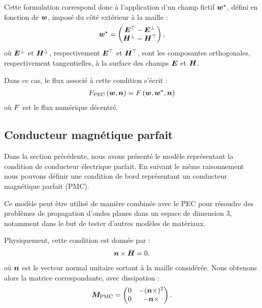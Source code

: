Cette formulation correspond donc à l'application d'un champ
fictif $\bm{w}^\star$, défini en fonction de $\bm{w}$,
imposé du côté extérieur à la maille :
\begin{align}
	\bm{w}^\star =
	\begin{pmatrix}
		\bm{E}^\top - \bm{E}^\bot \\
		\bm{H}^\bot - \bm{H}^\top 
	\end{pmatrix}
	,
\end{align}
où $\bm{E}^\bot$ et $\bm{H}^\bot$, respectivement $\bm{E}^\top$ et $\bm{H}^\top$,
sont les composantes orthogonales, respectivement tangentielles,
à la surface des champs $\bm{E}$ et $\bm{H}$.

Dans ce cas, le flux associé à cette condition s’écrit :
\begin{align}
	F_\mathrm{PEC}\left(\bm{w},\bm{n}\right) = F\left(\bm{w},\bm{w}^\star,\bm{n}\right)
\end{align}
où $F$ est le flux numérique décentré.
\\


\subsection{Conducteur magnétique parfait}
\label{ssect:PMC}

Dans la section précédente, nous avons présenté le modèle représentant la
condition de conducteur électrique parfait. En suivant le même raisonnement
nous pouvons définir une condition de bord représentant un conducteur
magnétique parfait (PMC).

Ce modèle peut être utilisé de manière combinée avec le PEC pour résoudre
des problèmes de propagation d'ondes planes dans un espace
de dimension $3$, notamment dans le but de tester d'autres
modèles de matériaux.

Physiquement, cette condition est donnée par :
\begin{align}
	\bm{n} \times \bm{H} = 0 ,
\end{align}
où $\bm{n}$ est le vecteur normal unitaire sortant à la maille considérée.
Nous obtenons alors la matrice correspondante, avec dissipation :
\begin{align}
	\bm{M}_{\mathrm{PMC}} =
	\begin{pmatrix}
		0 & - (\bm{n} \times)^2 \\
		0 & - \bm{n} \times
	\end{pmatrix} .
\end{align}
\\

